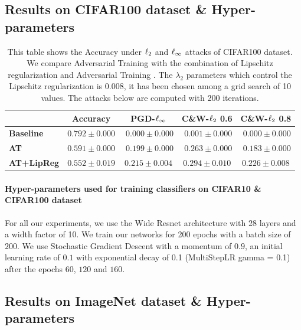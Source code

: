 \subsection{Results on CIFAR100 dataset \& Hyper-parameters}

\begin{table}[htb]
  \centering
  \caption{This table shows the Accuracy under $\ell_2$ and $\ell_\infty$ attacks of CIFAR100 dataset. We compare Adversarial Training with the combination of Lipschitz regularization and Adversarial Training \cite{madry2018towards}. The $\lambda_2$ parameters which control the Lipschitz regularization is $0.008$, it has been chosen among a grid search of 10 values. The attacks below are computed with 200 iterations.}
    \begin{tabular}{lcccc}
    \toprule
      & \textbf{Accuracy} & \textbf{PGD-$\ell_\infty$} & \textbf{C\&W-$\ell_2$ 0.6} & \textbf{C\&W-$\ell_2$ 0.8} \\
    \midrule
    \textbf{Baseline} & $\mathbf{0.792}\pm0.000$ & $\phantom{.}0.000\pm0.000$ & $\phantom{.}0.001\pm0.000$ & $\phantom{.}0.000\pm0.000$ \\
    \textbf{AT} & \phantom{.}$0.591\pm0.000$ & $\phantom{.}0.199\pm0.000$ & $\phantom{.}0.263\pm0.000$ & $\phantom{.}0.183\pm0.000$ \\
    \textbf{AT+LipReg} & \phantom{.}$0.552\pm0.019$ & $\mathbf{0.215}\pm0.004$ & $\mathbf{0.294}\pm0.010$ & $\mathbf{0.226}\pm0.008$ \\
    \bottomrule
    \end{tabular}%
  \label{tab:results_cifar100}%
\end{table}%


\paragraph{Hyper-parameters used for training classifiers on CIFAR10 \& CIFAR100 dataset}
For all our experiments, we use the Wide Resnet architecture \cite{zagoruyko2016wide} with 28 layers and a width factor of 10. We train our networks for 200 epochs with a batch size of $200$. We use Stochastic Gradient Descent with a momentum of $0.9$, an initial learning rate of $0.1$ with exponential decay of 0.1 (MultiStepLR gamma = 0.1) after the epochs $60$, $120$ and $160$. 

\subsection{Results on ImageNet dataset \& Hyper-parameters}

